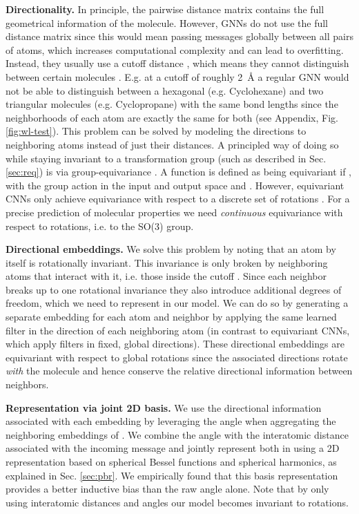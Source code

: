 \documentclass{article} \usepackage{iclr2020_conference,times}
\begin{document}
\textbf{Directionality.} In principle, the pairwise distance matrix contains the full geometrical information of the molecule. However, GNNs do not use the full distance matrix since this would mean passing messages globally between all pairs of atoms, which increases computational complexity and can lead to overfitting. Instead, they usually use a cutoff distance , which means they cannot distinguish between certain molecules \citep{xu_how_2019}. E.g. at a cutoff of roughly \SI{2}{\angstrom} a regular GNN would not be able to distinguish between a hexagonal (e.g. Cyclohexane) and two triangular molecules (e.g. Cyclopropane) with the same bond lengths since the neighborhoods of each atom are exactly the same for both (see Appendix, Fig. \ref{fig:wl-test}). This problem can be solved by modeling the directions to neighboring atoms instead of just their distances. A principled way of doing so while staying invariant to a transformation group  (such as described in Sec. \ref{sec:req}) is via group-equivariance \citep{cohen_group_2016}. A function  is defined as being equivariant if , with the group action in the input and output space  and . However, equivariant CNNs only achieve equivariance with respect to a discrete set of rotations \citep{cohen_group_2016}. For a precise prediction of molecular properties we need \emph{continuous} equivariance with respect to rotations, i.e. to the SO(3) group.

\textbf{Directional embeddings.} We solve this problem by noting that an atom by itself is rotationally invariant. This invariance is only broken by neighboring atoms that interact with it, i.e. those inside the cutoff . Since each neighbor breaks up to one rotational invariance they also introduce additional degrees of freedom, which we need to represent in our model. We can do so by generating a separate embedding  for each atom  and neighbor  by applying the same learned filter in the direction of each neighboring atom (in contrast to equivariant CNNs, which apply filters in fixed, global directions). These directional embeddings are equivariant with respect to global rotations since the associated directions rotate \emph{with} the molecule and hence conserve the relative directional information between neighbors.

\textbf{Representation via joint 2D basis.} We use the directional information associated with each embedding by leveraging the angle  when aggregating the neighboring embeddings  of . We combine the angle with the interatomic distance  associated with the incoming message  and jointly represent both in  using a 2D representation based on spherical Bessel functions and spherical harmonics, as explained in Sec. \ref{sec:pbr}. We empirically found that this basis representation provides a better inductive bias than the raw angle alone. Note that by only using interatomic distances and angles our model becomes invariant to rotations.
\end{document}
